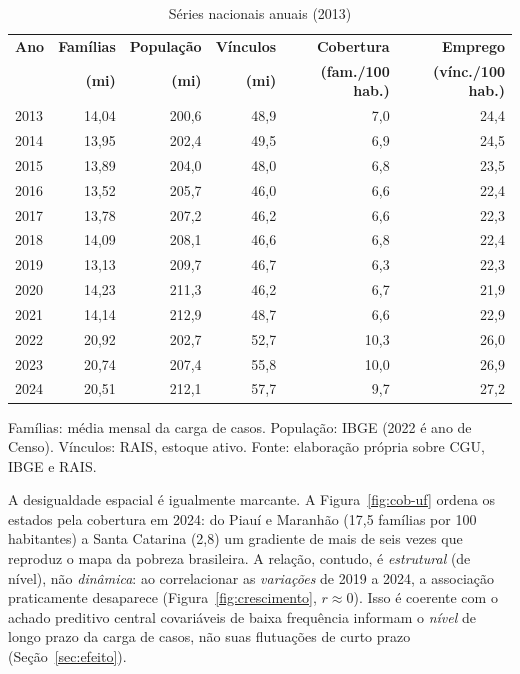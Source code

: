 \documentclass[12pt,a4paper,oneside]{article}
\begin{document}
\begin{table}[H]
\centering
\caption{Séries nacionais anuais (2013)}
\label{tab:nacional}
\small
\begin{tabular}{@{}lrrrrr@{}}
\toprule
\textbf{Ano} & \textbf{Famílias} & \textbf{População} & \textbf{Vínculos} & \textbf{Cobertura} & \textbf{Emprego} \\
 & \textbf{(mi)} & \textbf{(mi)} & \textbf{(mi)} & \textbf{(fam./100 hab.)} & \textbf{(vínc./100 hab.)} \\
\midrule
2013 & 14,04 & 200,6 & 48,9 & 7,0 & 24,4 \\
2014 & 13,95 & 202,4 & 49,5 & 6,9 & 24,5 \\
2015 & 13,89 & 204,0 & 48,0 & 6,8 & 23,5 \\
2016 & 13,52 & 205,7 & 46,0 & 6,6 & 22,4 \\
2017 & 13,78 & 207,2 & 46,2 & 6,6 & 22,3 \\
2018 & 14,09 & 208,1 & 46,6 & 6,8 & 22,4 \\
2019 & 13,13 & 209,7 & 46,7 & 6,3 & 22,3 \\
2020 & 14,23 & 211,3 & 46,2 & 6,7 & 21,9 \\
2021 & 14,14 & 212,9 & 48,7 & 6,6 & 22,9 \\
2022 & 20,92 & 202,7 & 52,7 & 10,3 & 26,0 \\
2023 & 20,74 & 207,4 & 55,8 & 10,0 & 26,9 \\
2024 & 20,51 & 212,1 & 57,7 & 9,7 & 27,2 \\
\bottomrule
\end{tabular}
\par\smallskip
{\footnotesize Famílias: média mensal da carga de casos. População: IBGE
(2022 é ano de Censo). Vínculos: RAIS, estoque ativo. Fonte: elaboração
própria sobre CGU, IBGE e RAIS.}
\end{table}

A desigualdade espacial é igualmente marcante. A Figura~\ref{fig:cob-uf}
ordena os estados pela cobertura em 2024: do Piauí e Maranhão (17,5
famílias por 100 habitantes) a Santa Catarina (2,8) \textemdash{} um
gradiente de mais de seis vezes que reproduz o mapa da pobreza brasileira.
A relação, contudo, é \emph{estrutural} (de nível), não \emph{dinâmica}: ao
correlacionar as \emph{variações} de 2019 a 2024, a associação praticamente
desaparece (Figura~\ref{fig:crescimento}, $r\approx 0$). Isso é coerente
com o achado preditivo central \textemdash{} covariáveis de baixa
frequência informam o \emph{nível} de longo prazo da carga de casos, não
suas flutuações de curto prazo (Seção~\ref{sec:efeito}).
\end{document}
